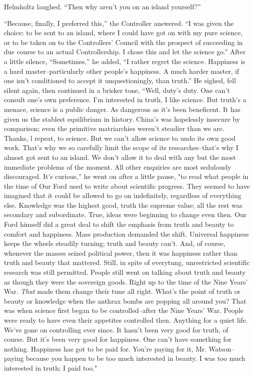 \documentclass[12pt]{report}
\begin{document}
Helmholtz laughed. ``Then why aren't you on an island yourself?''

``Because, finally, I preferred this,'' the Controller answered. ``I was
given the choice: to be sent to an island, where I could have got on
with my pure science, or to be taken on to the Controllers' Council with
the prospect of succeeding in due course to an actual Controllership. I
chose this and let the science go.'' After a little silence,
``Sometimes,'' he added, ``I rather regret the science. Happiness is a
hard master--particularly other people's happiness. A much harder
master, if one isn't conditioned to accept it unquestioningly, than
truth.'' He sighed, fell silent again, then continued in a brisker tone,
``Well, duty's duty. One can't consult one's own preference. I'm
interested in truth, I like science. But truth's a menace, science is a
public danger. As dangerous as it's been beneficent. It has given us the
stablest equilibrium in history. China's was hopelessly insecure by
comparison; even the primitive matriarchies weren't steadier than we
are. Thanks, l repeat, to science. But we can't allow science to undo
its own good work. That's why we so carefully limit the scope of its
researches--that's why I almost got sent to an island. We don't allow it
to deal with any but the most immediate problems of the moment. All
other enquiries are most sedulously discouraged. It's curious,'' he went
on after a little pause, "to read what people in the time of Our Ford
used to write about scientific progress. They seemed to have imagined
that it could be allowed to go on indefinitely, regardless of everything
else. Knowledge was the highest good, truth the supreme value; all the
rest was secondary and subordinate. True, ideas were beginning to change
even then. Our Ford himself did a great deal to shift the emphasis from
truth and beauty to comfort and happiness. Mass production demanded the
shift. Universal happiness keeps the wheels steadily turning; truth and
beauty can't. And, of course, whenever the masses seized political
power, then it was happiness rather than truth and beauty that mattered.
Still, in spite of everytung, unrestricted scientific research was still
permitted. People still went on talking about truth and beauty as though
they were the sovereign goods. Right up to the time of the Nine Years'
War. \emph{That} made them change their tune all right. What's the point
of truth or beauty or knowledge when the anthrax bombs are popping all
around you? That was when science first began to be controlled--after
the Nine Years' War. People were ready to have even their appetites
controlled then. Anything for a quiet life. We've gone on controlling
ever since. It hasn't been very good for truth, of course. But it's been
very good for happiness. One can't have something for nothing. Happiness
has got to be paid for. You're paying for it, Mr. Watson--paying because
you happen to be too much interested in beauty. I was too much
interested in truth; I paid too."
\end{document}
